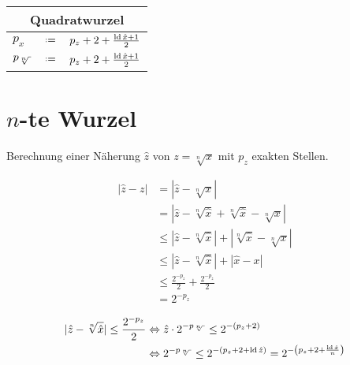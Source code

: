 \begin{algorithm}
\phantom{}
\begin{center}
\renewcommand*{\arraystretch}{1.3}
\begin{tabular}{lcl}
  \hline
  \multicolumn{3}{c}{Quadratwurzel} \\
  \hline
   $p_x$   & $\defeq$ & $p_z+2+\frac{\mathop{\rm ld}\nolimits\hat{x}+1}{2}$ \\
   $p_\op$ & $\defeq$ & $p_z+2+\frac{\mathop{\rm ld}\nolimits\hat{x}+1}{2}$ \\
  \hline
\end{tabular}
\end{center}
\end{algorithm}







\pagebreak
\section{$n$-te Wurzel}

\renewcommand{\op}{{\sqrt[n]{\phantom{\cdot}}}}

Berechnung einer Näherung $\hat{z}$ von $z=\sqrt[n]{x}$ mit $p_z$ exakten Stellen.

\begin{equation*}
\begin{split}
  |\hat{z}-z| & =  |\hat{z}-\sqrt[n]{x}| \\
              & =  |\hat{z}-\sqrt[n]{\hat{x}}+\sqrt[n]{\hat{x}}-\sqrt[n]{x}| \\
              &\le |\hat{z}-\sqrt[n]{\hat{x}}|+|\sqrt[n]{\hat{x}}-\sqrt[n]{x}| \\
              &\le |\hat{z}-\sqrt[n]{\hat{x}}|+|\hat{x}-x| \\
              &\le \frac{2^{-p_z}}{2} + \frac{2^{-p_z}}{2} \\
              & =  2^{-p_z}
\end{split}
\end{equation*}

\begin{equation*}
\begin{split}
  |\hat{z}-\sqrt[n]{\hat{x}}| \le \frac{2^{-p_z}}{2}
  & \Leftrightarrow
  \hat{z}\cdot 2^{-p_\op} \le 2^{-(p_z+2)}  \\
  & \Leftrightarrow
  2^{-p_\op}\le 2^{-(p_z+2+\ld\hat{z})} 
  = 2^{-\left(p_z+2+\frac{\ld\hat{x}}{n}\right)}
\end{split}
\end{equation*}

